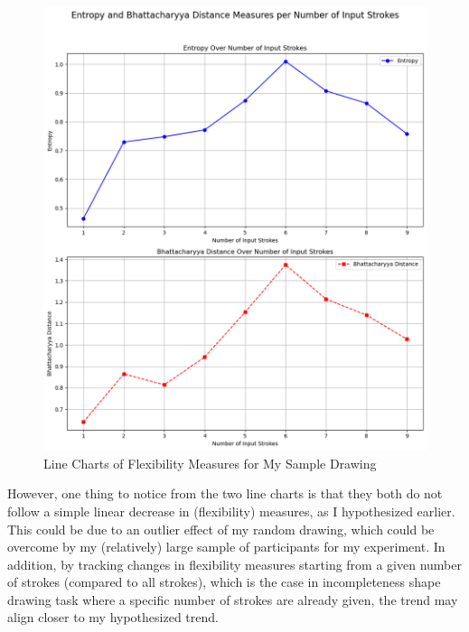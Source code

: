 \documentclass[../Proposal_Writing_Sample.tex]{subfiles}
\begin{document}
\begin{figure}[htbp]
    \centering
    \includegraphics[scale=0.7]{screenshots/Entropy and Bhattacharyya Distance Measures per Number of Input Strokes.png}
    \caption{Line Charts of Flexibility Measures for My Sample Drawing}
    \label{fig: Line Charts of Flexibility Measures for My Sample Drawing}
\end{figure}

However, one thing to notice from the two line charts is that they both do not follow a simple linear decrease in (flexibility) measures, as I hypothesized earlier. This could be due to an outlier effect of my random drawing, which could be overcome by my (relatively) large sample of participants for my experiment. In addition, by tracking changes in flexibility measures starting from a given number of strokes (compared to all strokes), which is the case in incompleteness shape drawing task where a specific number of strokes are already given, the trend may align closer to my hypothesized trend.
\end{document}
